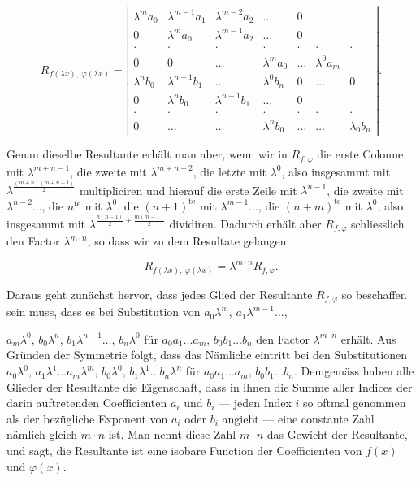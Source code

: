 \documentclass[11pt]{article}
\providecommand{\weberpage}[1]{}
\begin{document}
\[
R_{f(\lambda x),\ \varphi(\lambda x)} =
\left|
\begin{array}{ccccccc}
\lambda^m a_0 & \lambda^{m-1}a_1 & \lambda^{m-2}a_2 & \ldots & 0 \\
0 & \lambda^m a_0 & \lambda^{m-1}a_2 & \ldots & 0 \\
\cdot & \cdot & \cdot & \cdot & \cdot & \cdot & \cdot \\
0 & 0 & \ldots & \lambda^m a_0 & \ldots & \lambda^0 a_m \\
\lambda^n b_0 & \lambda^{n-1}b_1 & \ldots & \lambda^0 b_n & 0 & \ldots & 0 \\
0 & \lambda^n b_0 & \lambda^{n-1}b_1 & \ldots & 0 \\
\cdot & \cdot & \cdot & \cdot & \cdot & \cdot & \cdot \\
0 & \ldots & \ldots & \lambda^n b_0 & \ldots & \ldots & \lambda_0 b_n
\end{array}
\right| .
\]

Genau dieselbe Resultante erh\"alt man aber, wenn wir in $R_{f,\varphi}$ die erste Colonne
mit $\lambda^{m+n-1}$, die zweite mit $\lambda^{m+n-2}$, die letzte mit $\lambda^0$, also
insgesammt mit $\lambda^{\frac{(m+n)(m+n-1)}{2}}$ multipliciren und hierauf die erste Zeile
mit $\lambda^{n-1}$, die zweite mit $\lambda^{n-2}\ldots$, die $n^{\text{te}}$ mit $\lambda^0$,
die $(n+1)^{\text{te}}$ mit $\lambda^{m-1}\ldots$, die $(n+m)^{\text{te}}$ mit $\lambda^0$,
also insgesammt mit $\lambda^{\frac{n(n-1)}{2}+\frac{m(m-1)}{2}}$ dividiren. Dadurch erh\"alt
aber $R_{f,\varphi}$ schliesslich den Factor $\lambda^{m\cdot n}$, so dass wir zu dem
Resultate gelangen:

\[ R_{f(\lambda x),\ \varphi(\lambda x)} = \lambda^{m\cdot n} R_{f,\varphi}. \]

Daraus geht zun\"achst hervor, dass jedes Glied der Resultante $R_{f,\varphi}$ so beschaffen
sein muss, dass es bei Substitution von $a_0\lambda^m$, $a_1\lambda^{m-1}\ldots$,


\weberpage{148}
$a_m\lambda^0$, $b_0\lambda^n$, $b_1\lambda^{n-1}\ldots$, $b_n\lambda^0$ f\"ur
$a_0a_1\ldots a_m$, $b_0b_1\ldots b_n$ den Factor $\lambda^{m\cdot n}$ erh\"alt. Aus
Gr\"unden der Symmetrie folgt, dass das N\"amliche eintritt bei den Substitutionen
$a_0\lambda^0$, $a_1\lambda^1\ldots a_m\lambda^m$, $b_0\lambda^0$, $b_1\lambda^1\ldots
b_n\lambda^n$ f\"ur $a_0a_1\ldots a_m$, $b_0b_1\ldots b_n$. Demgem\"ass haben alle Glieder der
Resultante die Eigenschaft, dass in ihnen die Summe aller Indices der darin auftretenden
Coefficienten $a_i$ und $b_i$ --- jeden Index $i$ so oftmal genommen als der bez\"ugliche
Exponent von $a_i$ oder $b_i$ angiebt --- eine constante Zahl n\"amlich gleich $m\cdot n$
ist. Man nennt diese Zahl $m\cdot n$ das Gewicht der Resultante, und sagt, die Resultante
ist eine isobare Function der Coefficienten von $f(x)$ und $\varphi(x)$.
\end{document}

